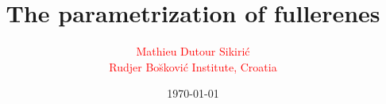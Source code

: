 \documentclass{beamer}
\begin{document}
\title{The parametrization of fullerenes}
\author{
{\small
\begin{center}
\textcolor{red}{\large Mathieu Dutour Sikiri\'c}\\[2mm]
\textcolor{red}{Rudjer Bo\u skovi\'c Institute, Croatia}
\end{center}
}
}
\date{\today} 
\frame{\titlepage} 





\end{document}
